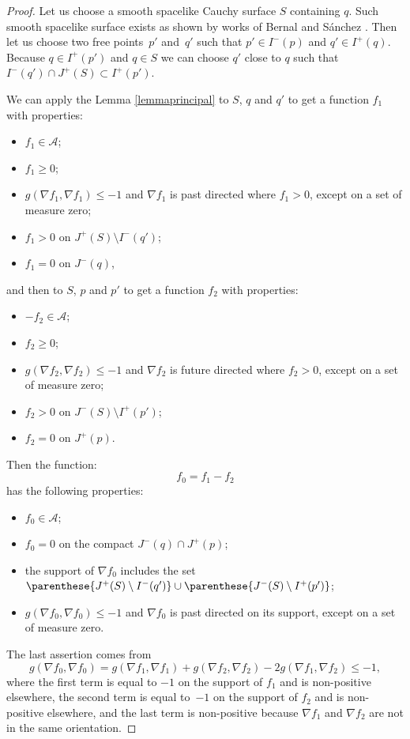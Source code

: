 \begin{proof}
Let us choose a smooth spacelike Cauchy surface $S$ containing $q$. Such smooth spacelike surface exists as shown by works of Bernal and S\'anchez \cite{BS03,BS04}. Then let us choose two free points~$p'$ and~$q'$ such that $p' \in I^-(p)$ and $q' \in I^+(q)$.  Because $q \in I^+(p')$ and $q\in S$ we can choose $q'$ close to $q$ such that $I^-(q') \cap J^+(S) \subset I^+(p')$.

We can apply the Lemma \ref{lemmaprincipal} to $S$, $q$ and $q'$ to get a function $f_1$ with properties:
\begin{itemize}\itemsep=0pt
\item $f_1 \in \mathcal A$;
\item $f_1 \geq 0 $;
\item $g( \nabla f_1, \nabla f_1 ) \leq -1$ and $\nabla f_1$ is past directed where $f_1 > 0$, except on a set of measure zero;
\item $f _1> 0$ on $J^+(S) \setminus I^-(q')$;
\item $f_1 = 0$ on $J^-(q)$,
\end{itemize}
and then to $S$, $p$ and $p'$ to get a function $f_2$ with properties:
\begin{itemize}\itemsep=0pt
\item $-f_2 \in \mathcal A$;
\item $f_2 \geq 0 $;
\item $g( \nabla f_2, \nabla f_2 ) \leq -1$ and $\nabla f_2$ is future directed where $f_2> 0$, except on a set of measure zero;
\item $f_2 > 0$ on $J^-(S) \setminus I^+(p')$;
\item $f_2 = 0$ on $J^+(p)$.
\end{itemize}

Then the function:
\[
f_0 = f_1 - f_2
\]
has the following properties:
\begin{itemize}\itemsep=0pt
\item $f_0\in\mathcal A$;
\item $f_0 = 0$ on the compact $J^-(q) \cap J^+(p)$;
\item the support of $\nabla f_0$ includes the set $\parenthese{J^+(S) \setminus I^-(q')} \cup  \parenthese{J^-(S) \setminus I^+(p')}$;
\item $g( \nabla f_0, \nabla f_0) \leq -1$ and $\nabla f_0$ is past directed on its support, except on a set of measure zero.
\end{itemize}
The last assertion comes from
\[
g( \nabla f_0, \nabla f_0 ) =  g( \nabla f_1, \nabla f_1 ) + g( \nabla f_2, \nabla f_2 ) -  2 g( \nabla f_1, \nabla f_2 ) \leq -1,
\]
where the f\/irst term is equal to $-1$ on the support of $f_1$ and is non-positive elsewhere, the second term is equal to~$-1$ on the support of $f_2$ and is non-positive elsewhere, and the last term is non-positive because $\nabla f_1$ and $\nabla f_2$ are not in the same orientation.


\end{proof}
